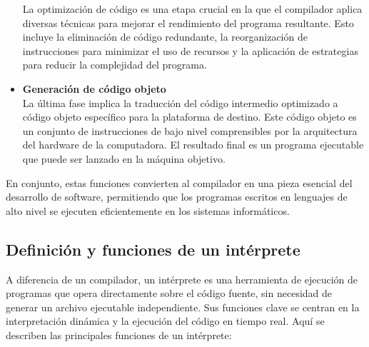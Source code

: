 \begin{itemize}
  La optimización de código es una etapa crucial en la que el compilador aplica diversas técnicas para mejorar el rendimiento del programa resultante. Esto incluye la eliminación de código redundante, la reorganización de instrucciones para minimizar el uso de recursos y la aplicación de estrategias para reducir la complejidad del programa. \parencite{cooper2022}
  \item \textbf{Generación de código objeto} \\
  La última fase implica la traducción del código intermedio optimizado a código objeto específico para la plataforma de destino. Este código objeto es un conjunto de instrucciones de bajo nivel comprensibles por la arquitectura del hardware de la computadora. El resultado final es un programa ejecutable que puede ser lanzado en la máquina objetivo. \parencite{cooper2022}
\end{itemize}

En conjunto, estas funciones convierten al compilador en una pieza esencial del desarrollo de software, permitiendo que los programas escritos en lenguajes de alto nivel se ejecuten eficientemente en los sistemas informáticos.

\subsection{Definición y funciones de un intérprete}
A diferencia de un compilador, un intérprete es una herramienta de ejecución de programas que opera directamente sobre el código fuente, sin necesidad de generar un archivo ejecutable independiente. Sus funciones clave se centran en la interpretación dinámica y la ejecución del código en tiempo real. Aquí se describen las principales funciones de un intérprete:

